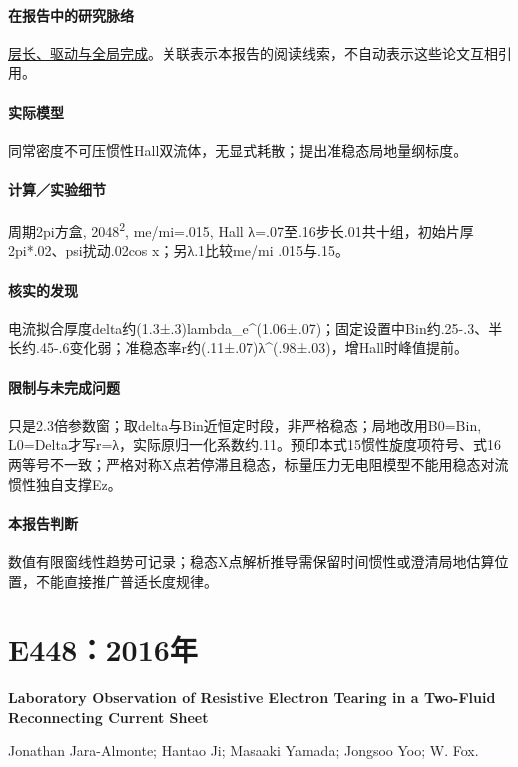 \paragraph{在报告中的研究脉络}\hyperref[story:global]{层长、驱动与全局完成}。关联表示本报告的阅读线索，不自动表示这些论文互相引用。

\paragraph{实际模型}同常密度不可压惯性Hall双流体，无显式耗散；提出准稳态局地量纲标度。

\paragraph{计算／实验细节}周期2pi方盒, 2048\textsuperscript{2}, me/mi=.015, Hall λ=.07至.16步长.01共十组，初始片厚2pi*.02、psi扰动.02cos x；另λ.1比较me/mi .015与.15。

\paragraph{核实的发现}电流拟合厚度delta约(1.3±.3)lambda\_e\textasciicircum{}(1.06±.07)；固定设置中Bin约.25-.3、半长约.45-.6变化弱；准稳态率r约(.11±.07)λ\textasciicircum{}(.98±.03)，增Hall时峰值提前。

\paragraph{限制与未完成问题}只是2.3倍参数窗；取delta与Bin近恒定时段，非严格稳态；局地改用B0=Bin, L0=Delta才写r=λ，实际原归一化系数约.11。预印本式15惯性旋度项符号、式16两等号不一致；严格对称X点若停滞且稳态，标量压力无电阻模型不能用稳态对流惯性独自支撑Ez。

\paragraph{本报告判断}数值有限窗线性趋势可记录；稳态X点解析推导需保留时间惯性或澄清局地估算位置，不能直接推广普适长度规律。

\section{E448：2016年}\label{paper:E448}

\textbf{Laboratory Observation of Resistive Electron Tearing in a Two-Fluid Reconnecting Current Sheet}\citep{E448}\

Jonathan Jara-Almonte;  Hantao Ji;  Masaaki Yamada;  Jongsoo Yoo;  W. Fox.

